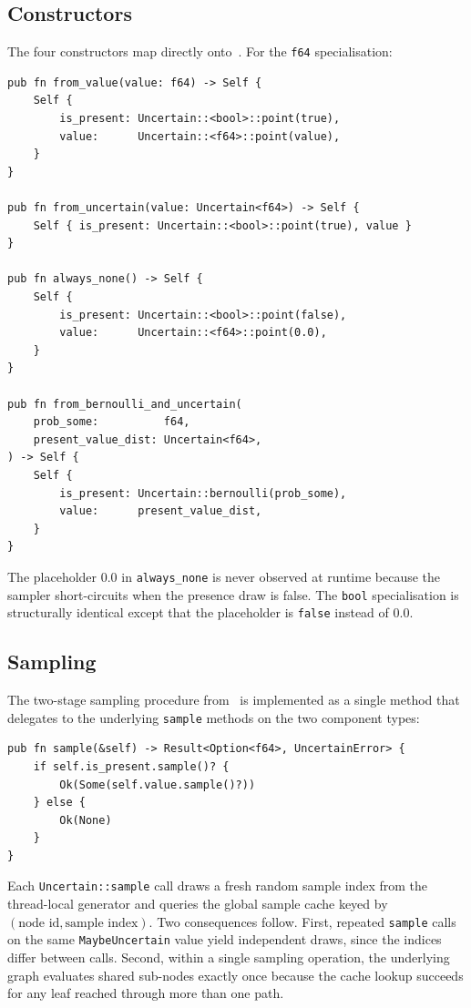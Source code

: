 \subsection{Constructors}
\label{sec:impl:ctors}

The four constructors map directly onto~. For the
\texttt{f64} specialisation:

\begin{lstlisting}
pub fn from_value(value: f64) -> Self {
    Self {
        is_present: Uncertain::<bool>::point(true),
        value:      Uncertain::<f64>::point(value),
    }
}

pub fn from_uncertain(value: Uncertain<f64>) -> Self {
    Self { is_present: Uncertain::<bool>::point(true), value }
}

pub fn always_none() -> Self {
    Self {
        is_present: Uncertain::<bool>::point(false),
        value:      Uncertain::<f64>::point(0.0),
    }
}

pub fn from_bernoulli_and_uncertain(
    prob_some:          f64,
    present_value_dist: Uncertain<f64>,
) -> Self {
    Self {
        is_present: Uncertain::bernoulli(prob_some),
        value:      present_value_dist,
    }
}
\end{lstlisting}

The placeholder $0.0$ in \texttt{always\_none} is never observed at
runtime because the sampler short-circuits when the presence draw is
false. The \texttt{bool} specialisation is structurally identical except
that the placeholder is \texttt{false} instead of $0.0$.

\subsection{Sampling}
\label{sec:impl:sampling}

The two-stage sampling procedure from~ is implemented
as a single method that delegates to the underlying \texttt{sample}
methods on the two component types:

\begin{lstlisting}
pub fn sample(&self) -> Result<Option<f64>, UncertainError> {
    if self.is_present.sample()? {
        Ok(Some(self.value.sample()?))
    } else {
        Ok(None)
    }
}
\end{lstlisting}

Each \texttt{Uncertain::sample} call draws a fresh random sample index from
the thread-local generator and queries the global sample cache keyed by
$(\text{node id}, \text{sample index})$. Two consequences follow. First,
repeated \texttt{sample} calls on the same \texttt{MaybeUncertain} value
yield independent draws, since the indices differ between calls. Second,
within a single sampling operation, the underlying graph evaluates shared
sub-nodes exactly once because the cache lookup succeeds for any leaf
reached through more than one path.

